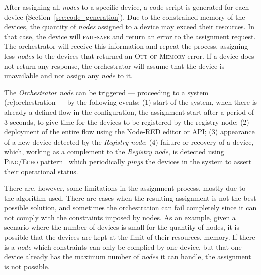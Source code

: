 After assigning all \textit{nodes} to a specific device, a code script is generated for each device (\cf Section~\ref{sec:code_generation}). Due to the constrained memory of the devices, the quantity of \textit{nodes} assigned to a device may exceed their resources. In that case, the device will \textsc{fail-safe} and return an error to the assignment request. The orchestrator will receive this information and repeat the process, assigning less \textit{nodes} to the devices that returned an \textsc{Out-of-Memory} error. If a device does not return any response, the orchestrator will assume that the device is unavailable and not assign any \textit{node} to it.


The \textit{Orchestrator node} can be triggered --- proceeding to a system (re)orchestration --- by the following events: (1) start of the system, when there is already a defined flow in the configuration, the assignment start after a period of 3 seconds, to give time for the devices to be registered by the registry node; (2) deployment of the entire flow using the Node-RED editor or API; (3) appearance of a new device detected by the \textit{Registry node}; (4) failure or recovery of a device, which, working as a complement to the \textit{Registry node}, is detected using \textsc{Ping/Echo} pattern~\cite{Scott2009} which periodically \textit{pings} the devices in the system to assert their operational status.  


There are, however, some limitations in the assignment process, mostly due to the algorithm used. There are cases when the resulting assignment is not the best possible solution, and sometimes the orchestration can fail completely since it can not comply with the constraints imposed by nodes. As an example, given a scenario where the number of devices is small for the quantity of nodes, it is possible that the devices are kept at the limit of their resources, \ie memory. If there is a \textit{node} which constraints can only be complied by one device, but that one device already has the maximum number of \textit{nodes} it can handle, the assignment is not possible.

